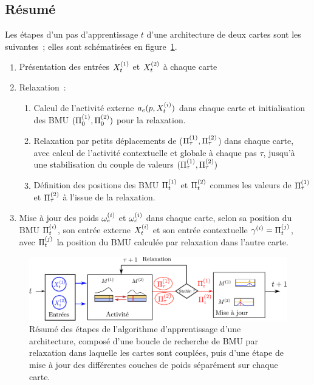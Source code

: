 \documentclass[../main]{subfiles}
\begin{document}
\subsection{Résumé}
Les étapes d'un pas d'apprentissage $t$ d'une architecture de deux cartes sont les suivantes~; elles sont schématisées en figure~\ref{fig:algo}.
\begin{enumerate}
\item Présentation des entrées $X^{({1})}_t$ et $X^{({2})}_t$ à chaque carte
\item Relaxation~:
\begin{enumerate}
\item Calcul de l'activité externe $a_e(p, X^{({i})}_t)$ dans chaque carte et initialisation des BMU $(\Pi^{({1})}_0,\Pi^{({2})}_0)$ pour la relaxation.
\item Relaxation par petits déplacements de ($\Pi^{({1})}_\tau,\Pi^{({2})}_\tau$) dans chaque carte, avec calcul de l'activité contextuelle et globale à chaque pas $\tau$, jusqu'à une stabilisation du couple de valeurs $(\Pi^{({1})}_\tau,\Pi^{({2})}_\tau)$
\item Définition des positions des BMU $\Pi^{({1})}_t$ et $\Pi^{({2})}_t$ commes les valeurs de $\Pi^{({1})}_\tau$ et $\Pi^{({2})}_\tau$ à l'issue de la relaxation.
\end{enumerate}
\item Mise à jour des poids $\omega_{e}^{({i})}$ et $\omega_{c}^{({i})}$ dans chaque carte, selon sa position du BMU $\Pi^{({i})}_t$, son entrée externe $X^{({i})}_t$ et son entrée contextuelle $ \gamma^{({i})} = \Pi^{({j})}_t$, avec $\Pi^{({j})}_t$ la position du BMU calculée par relaxation dans l'autre carte.
\end{enumerate}

\begin{figure}
\centering
\includegraphics[width=\textwidth]{learning_tests_2maps}
\caption{Résumé des étapes de l'algorithme d'apprentissage d'une architecture, composé d'une boucle de recherche de BMU par relaxation dans laquelle les cartes sont couplées, puis d'une étape de mise à jour des différentes couches de poids séparément sur chaque carte.}
\label{fig:algo}
\end{figure}
\end{document}
